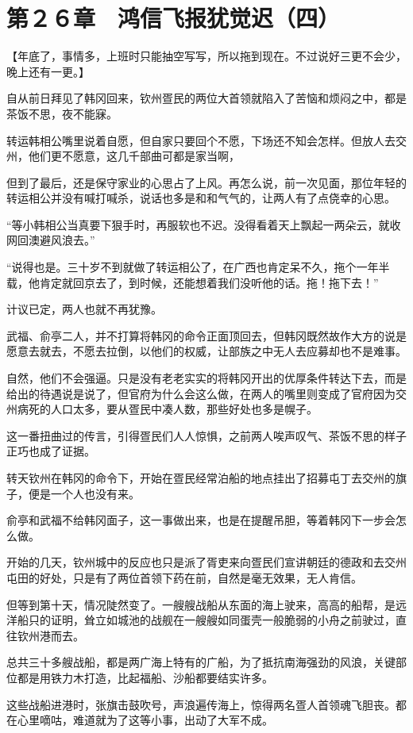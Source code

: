 \section{第２６章　鸿信飞报犹觉迟（四）}

【年底了，事情多，上班时只能抽空写写，所以拖到现在。不过说好三更不会少，晚上还有一更。】

自从前日拜见了韩冈回来，钦州疍民的两位大首领就陷入了苦恼和烦闷之中，都是茶饭不思，夜不能寐。

转运韩相公嘴里说着自愿，但自家只要回个不愿，下场还不知会怎样。但放人去交州，他们更不愿意，这几千部曲可都是家当啊，

但到了最后，还是保守家业的心思占了上风。再怎么说，前一次见面，那位年轻的转运相公并没有喊打喊杀，说话也多是和和气气的，让两人有了点侥幸的心思。

“等小韩相公当真要下狠手时，再服软也不迟。没得看着天上飘起一两朵云，就收网回澳避风浪去。”

“说得也是。三十岁不到就做了转运相公了，在广西也肯定呆不久，拖个一年半载，他肯定就回京去了，到时候，还能想着我们没听他的话。拖！拖下去！”

计议已定，两人也就不再犹豫。

武福、俞亭二人，并不打算将韩冈的命令正面顶回去，但韩冈既然故作大方的说是愿意去就去，不愿去拉倒，以他们的权威，让部族之中无人去应募却也不是难事。

自然，他们不会强逼。只是没有老老实实的将韩冈开出的优厚条件转达下去，而是给出的待遇说是说了，但官府为什么会这么做，在两人的嘴里则变成了官府因为交州病死的人口太多，要从疍民中凑人数，那些好处也多是幌子。

这一番扭曲过的传言，引得疍民们人人惊惧，之前两人唉声叹气、茶饭不思的样子正巧也成了证据。

转天钦州在韩冈的命令下，开始在疍民经常泊船的地点挂出了招募屯丁去交州的旗子，便是一个人也没有来。

俞亭和武福不给韩冈面子，这一事做出来，也是在提醒吊胆，等着韩冈下一步会怎么做。

开始的几天，钦州城中的反应也只是派了胥吏来向疍民们宣讲朝廷的德政和去交州屯田的好处，只是有了两位首领下药在前，自然是毫无效果，无人肯信。

但等到第十天，情况陡然变了。一艘艘战船从东面的海上驶来，高高的船帮，是远洋船只的证明，耸立如城池的战舰在一艘艘如同蛋壳一般脆弱的小舟之前驶过，直往钦州港而去。

总共三十多艘战船，都是两广海上特有的广船，为了抵抗南海强劲的风浪，关键部位都是用铁力木打造，比起福船、沙船都要结实许多。

这些战船进港时，张旗击鼓吹号，声浪遍传海上，惊得两名疍人首领魂飞胆丧。都在心里嘀咕，难道就为了这等小事，出动了大军不成。

